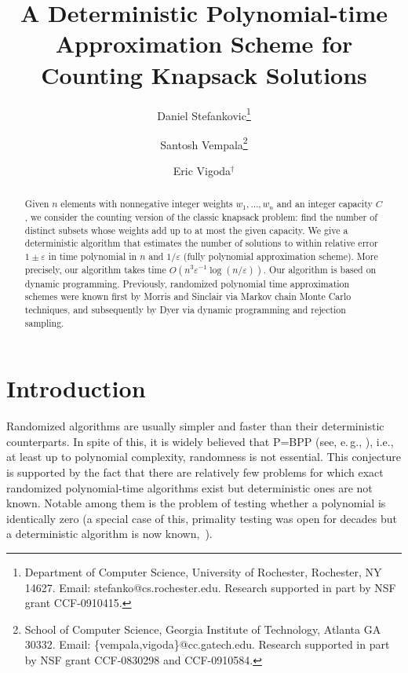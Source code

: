 \documentclass[11pt]{article}
\def\eps{\varepsilon}
\begin{document}
\title{A Deterministic Polynomial-time Approximation Scheme for Counting Knapsack Solutions}

\author{
Daniel Stefankovic\thanks{
Department of Computer Science, University of Rochester,
Rochester, NY 14627.  Email: stefanko@cs.rochester.edu.
Research supported in part by NSF grant CCF-0910415.
}
\and
Santosh Vempala\thanks{School of Computer Science, Georgia
Institute of Technology, Atlanta GA 30332.
Email: \{vempala,vigoda\}@cc.gatech.edu.
Research supported in part by NSF grant CCF-0830298 and CCF-0910584.}
\and
Eric Vigoda$^\dag$}



\maketitle


\begin{abstract}
Given $n$ elements with nonnegative integer weights $w_1, \ldots,
w_n$ and an integer capacity $C$, we consider the counting version
of the classic knapsack problem: find the number of distinct
subsets whose weights add up to at most the given capacity. We
give a deterministic algorithm that estimates the number of
solutions to within relative error $1\pm\eps$ in time polynomial
in $n$ and $1/\eps$ (fully polynomial approximation scheme). More
precisely, our algorithm takes time $O(n^3\eps^{-1}\log(n/\eps))$.
Our algorithm is based on dynamic programming.  Previously,
randomized polynomial time approximation schemes were known first
by Morris and Sinclair via Markov chain Monte Carlo techniques,
and subsequently by Dyer via dynamic programming and rejection
sampling.
\end{abstract}

\section{Introduction}
Randomized algorithms are usually simpler and faster than their
deterministic counterparts. In spite of this, it is widely
believed that P=BPP (see, e.\,g., \cite{AroraBarak}), i.e., at
least up to polynomial complexity, randomness is not essential.
This conjecture is supported by the fact that there are relatively
few problems for which exact randomized polynomial-time algorithms
exist but deterministic ones are not known. Notable among them is
the problem of testing whether a polynomial is identically zero (a
special case of this, primality testing was open for decades but a
deterministic algorithm is now known,~\cite{AKS}).
\end{document}
